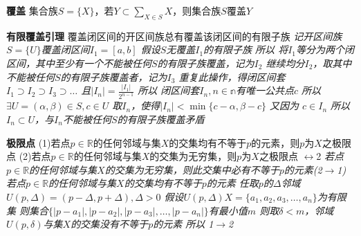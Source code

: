\documentclass[11pt]{article}
\begin{document}
\textbf{覆盖}
\newline
集合族$S=\{X\}$，若$Y\subset\sum\limits_{X\in S}X$，则集合族$S$覆盖$Y$
\newline

\textbf{有限覆盖引理}
\newline
覆盖闭区间的开区间族总有覆盖该闭区间的有限子族
\newline
\textit{记开区间族$S=\{U\}$覆盖闭区间$I_1=[a,b]$
\newline
假设$S$无覆盖$I_1$的有限子族
\newline
所以 将$I_1$等分为两个闭区间，其中至少有一个不能被任何$S$的有限子族覆盖，记为$I_2$
\newline
继续均分$I_2$，取其中不能被任何$S$的有限子族覆盖者，记为$I_3$
\newline
重复此操作，得闭区间套$I_1\supset I_2\supset I_3\supset\dots$
\newline
且$|I_n|=\frac{|I_1|}{2^{n-1}}$
\newline
所以 闭区间套${I_n,n\in\mathbb{n}}$有唯一公共点$c$
\newline
所以$\exists U=(\alpha,\beta)\in S, c\in U$
\newline
取$I_n$，使得$|I_n|<\min\{c-\alpha,\beta-c\}$
\newline
又因为 $c\in I_n$
\newline
所以$I_n\subset U$，与$I_n$不能被任何$S$的有限子族覆盖矛盾}
\newline

\textbf{极限点}
\newline
(1)若点$p\in\mathbb{R}$的任何邻域与集$X$的交集均有不等于$p$的元素，则$p$为$X$之极限点
\newline
(2)若点$p\in\mathbb{R}$的任何邻域与集$X$的交集为无穷集，则$p$为$X$之极限点
$\longleftrightarrow$2
\newline
\textit{若点$p\in\mathbb{R}$的任何邻域与集$X$的交集为无穷集，则此交集中必有不等于$p$的元素(2$\rightarrow$1)
\newline
若点$p\in\mathbb{R}$的任何邻域与集$X$的交集均有不等于$p$的元素
\newline
任取$p$的$\Delta$邻域$U(p,\Delta)=(p-\Delta,p+\Delta), \Delta>0$
\newline
假设$U(p,\Delta)X=\{a_1,a_2,a_3,\dots,a_n\}$为有限集
\newline
则集合$\{|p-a_1|,|p-a_2|,|p-a_3|,\dots,|p-a_n|\}$有最小值$m$
\newline
则取$\delta<m$，邻域$U(p,\delta)$与集$X$的交集没有不等于$p$的元素
\newline
所以 1$\rightarrow$2}
\newline
\end{document}
